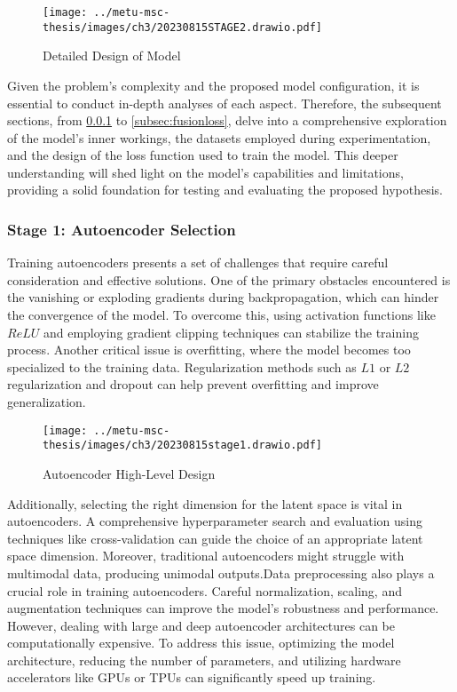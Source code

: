 \begin{figure}[htbp]
    \centering
    \texttt{[image: ../metu-msc-thesis/images/ch3/20230815STAGE2.drawio.pdf]}
    \caption{Detailed Design of Model}
    \label{fig:ch3:highlevel2}
\end{figure}

Given the problem's complexity and the proposed model configuration, it is essential to conduct in-depth analyses of each aspect. Therefore, the subsequent sections, from \ref{subsec:aesel} to \ref{subsec:fusionloss}, delve into a comprehensive exploration of the model's inner workings, the datasets employed during experimentation, and the design of the loss function used to train the model. This deeper understanding will shed light on the model's capabilities and limitations, providing a solid foundation for testing and evaluating the proposed hypothesis.

\subsubsection{Stage 1: Autoencoder Selection} \label{subsec:aesel}

Training autoencoders presents a set of challenges that require careful consideration and effective solutions. One of the primary obstacles encountered is the vanishing or exploding gradients during backpropagation, which can hinder the convergence of the model. To overcome this, using activation functions like $ReLU$ and employing gradient clipping techniques can stabilize the training process. Another critical issue is overfitting, where the model becomes too specialized to the training data. Regularization methods such as $L1$ or $L2$ regularization and dropout can help prevent overfitting and improve generalization.

\begin{figure}[htbp]
    \centering
    \texttt{[image: ../metu-msc-thesis/images/ch3/20230815stage1.drawio.pdf]}
    \centering
    \caption{Autoencoder High-Level Design}
    \label{fig:ch3:encoderhighlevel}
\end{figure}

Additionally, selecting the right dimension for the latent space is vital in autoencoders. A comprehensive hyperparameter search and evaluation using techniques like cross-validation can guide the choice of an appropriate latent space dimension. Moreover, traditional autoencoders might struggle with multimodal data, producing unimodal outputs.Data preprocessing also plays a crucial role in training autoencoders. Careful normalization, scaling, and augmentation techniques can improve the model's robustness and performance. However, dealing with large and deep autoencoder architectures can be computationally expensive. To address this issue, optimizing the model architecture, reducing the number of parameters, and utilizing hardware accelerators like GPUs or TPUs can significantly speed up training.

